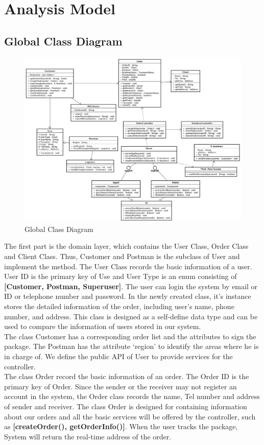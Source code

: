 \documentclass[12pt]{scrreprt}
\begin{document}
\section{Analysis Model}
\subsection{Global Class Diagram}
\begin{figure}[H]
  \centering\includegraphics[width=6in]{DocumentRes/ClassDiagram.png}
  \caption{Global Class Diagram}
\end{figure}
The first part is the domain layer, which contains the User Class, Order Class and Client Class. Thus, Customer and Postman is the subclass of User and implement the method. The User Class records the basic information of a user. User ID is the primary key of Use and User Type is an enum consisting of \textbf{[Customer, Postman, Superuser]}. The user can login the system by email or ID or telephone number and password. In the newly created class, it's instance stores the detailed information of the order, including user's name, phone number, and address. This class is designed as a self-define data type and can be used to compare the information of users stored in our system.\\
The class Customer has a corresponding order list and the attributes to sign the package. The Postman has the attribute ‘region’ to identify the areas where he is in charge of. We define the public API of User to provide services for the controller.\\
The class Order record the basic information of an order. The Order ID is the primary key of Order. Since the sender or the receiver may not register an account in the system, the Order class records the name, Tel number and address of sender and receiver. The class Order is designed for containing information about our orders and all the basic services will be offered by the controller, such as \textbf{[createOrder(), getOrderInfo()]}. When the user tracks the package, System will return the real-time address of the order.\\
\end{document}

